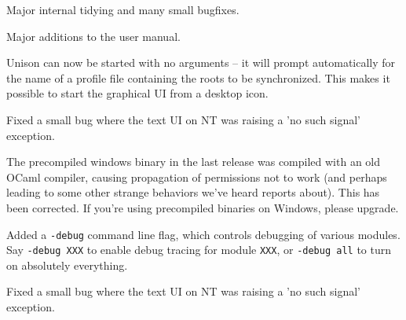 \begin{changesfromversion}{1.142}
\item Major internal tidying and many small bugfixes.
\item Major additions to the user manual.
\item Unison can now be started with no arguments -- it will prompt
automatically for the name of a profile file containing the roots to
be synchronized.  This makes it possible to start the graphical UI
from a desktop icon.
\item Fixed a small bug where the text UI on NT was raising a 'no such
  signal' exception.
\end{changesfromversion}

\begin{changesfromversion}{1.139}
\item The precompiled windows binary in the last release was compiled
with an old OCaml compiler, causing propagation of permissions not to
work (and perhaps leading to some other strange behaviors we've heard
reports about).  This has been corrected.  If you're using precompiled
binaries on Windows, please upgrade.
\item Added a \verb|-debug| command line flag, which controls debugging
of various modules.  Say \verb|-debug XXX| to enable debug tracing for
module \verb|XXX|, or \verb|-debug all| to turn on absolutely everything.
\item Fixed a small bug where the text UI on NT was raising a 'no such signal'
exception.
\end{changesfromversion}

